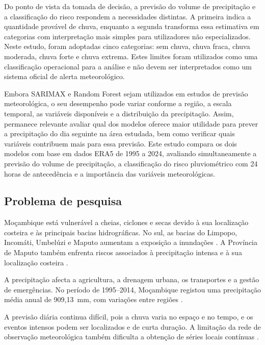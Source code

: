 \documentclass[9pt,twocolumn,twoside,english,portuguese]{opticajnl}
\begin{document}
Do ponto de vista da tomada de decisão, a previsão do volume de precipitação
e a classificação do risco respondem a necessidades distintas. A primeira
indica a quantidade provável de chuva, enquanto a segunda transforma essa
estimativa em categorias com interpretação mais simples para utilizadores não especializados. Neste estudo, foram adoptadas cinco categorias:
sem chuva, chuva fraca, chuva moderada, chuva forte e chuva extrema. Estes
limites foram utilizados como uma classificação operacional para a análise e
não devem ser interpretados como um sistema oficial de alerta meteorológico.

Embora SARIMAX e Random Forest sejam utilizados em estudos de previsão
meteorológica, o seu desempenho pode variar conforme a região, a escala
temporal, as variáveis disponíveis e a distribuição da precipitação. Assim,
permanece relevante avaliar qual dos modelos oferece maior utilidade para
prever a precipitação do dia seguinte na área estudada, bem como verificar
quais variáveis contribuem mais para essa previsão. Este estudo compara os
dois modelos com base em dados ERA5 de 1995 a 2024, avaliando simultaneamente
a previsão do volume de precipitação, a classificação do risco pluviométrico
com 24 horas de antecedência e a importância das variáveis meteorológicas.


\subsection{Problema de pesquisa}

Moçambique está vulnerável a cheias, ciclones e secas devido à sua localização costeira e às principais bacias hidrográficas. No sul, as bacias do Limpopo, Incomáti, Umbelúzi e Maputo aumentam a exposição a inundações
\cite{muleia2024mozambique}. A Província de Maputo também enfrenta riscos associados à precipitação intensa e à sua localização costeira
\cite{matos2023maputo}.

A precipitação afecta a agricultura, a drenagem urbana, os transportes e a
gestão de emergências. No período de 1995--2014, Moçambique registou uma
precipitação média anual de 909,13~mm, com variações entre regiões
\cite{worldbank_mozambique_climate}.

A previsão diária continua difícil, pois a chuva varia no espaço e no tempo,
e os eventos intensos podem ser localizados e de curta duração. A limitação
da rede de observação meteorológica também dificulta a obtenção de séries
locais contínuas \cite{wmo_mozambique_2024}.
\end{document}

